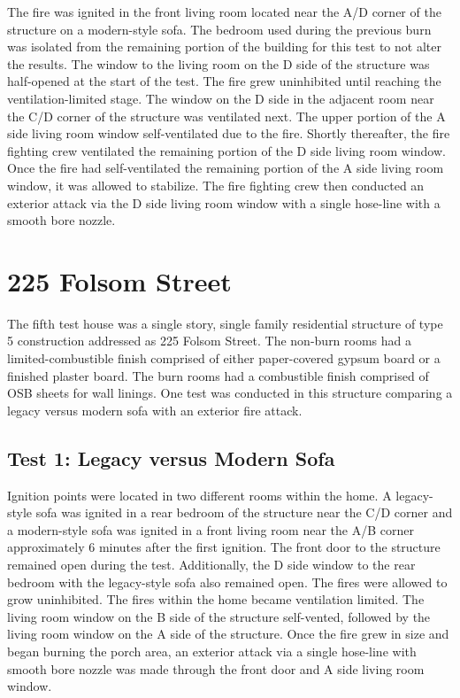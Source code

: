 \documentclass{article}
\begin{document}
The fire was ignited in the front living room located near the A/D corner of the structure on a modern-style sofa. The bedroom used during the previous burn was isolated from the remaining portion of the building for this test to not alter the results. The window to the living room on the D side of the structure was half-opened at the start of the test. The fire grew uninhibited until reaching the ventilation-limited stage. The window on the D side in the adjacent room near the C/D corner of the structure was ventilated next.  The upper portion of the A side living room window self-ventilated due to the fire.  Shortly thereafter, the fire fighting crew ventilated the remaining portion of the D side living room window. Once the fire had self-ventilated the remaining portion of the A side living room window, it was allowed to stabilize.  The fire fighting crew then conducted an exterior attack via the D side living room window with a single hose-line with a smooth bore nozzle. 

\section{225 Folsom Street}

 The fifth test house was a single story, single family residential structure of type 5 construction addressed as 225 Folsom Street. The non-burn rooms had a limited-combustible finish comprised of either paper-covered gypsum board or a finished plaster board.  The burn rooms had a combustible finish comprised of OSB sheets for wall linings.  One test was conducted in this structure comparing a legacy versus modern sofa with an exterior fire attack.
 
 \subsection{Test 1: Legacy versus Modern Sofa}
 
  Ignition points were located in two different rooms within the home. A legacy-style sofa was ignited in a rear bedroom of the structure near the C/D corner and a modern-style sofa was ignited in a front living room near the A/B corner approximately 6 minutes after the first ignition.  The front door to the structure remained open during the test. Additionally, the D side window to the rear bedroom with the legacy-style sofa also remained open.  The fires were allowed to grow uninhibited. The fires within the home became ventilation limited.  The living room window on the B side of the structure self-vented, followed by the living room window on the A side of the structure. Once the fire grew in size and began burning the porch area, an exterior attack via a single hose-line with smooth bore nozzle was made through the front door and A side living room window. 
  
\end{document}
